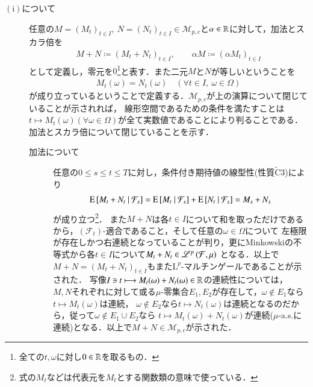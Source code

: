 	\begin{description}
		\item[$\mathrm{(i)}$について] 
			任意の$M=(M_t)_{t \in I},\ N=(N_t)_{t \in I} \in \mathcal{M}_{p,c}$と$\alpha \in \mathbb{R}$に対して，加法とスカラ倍を
			\begin{align}
				M + N \coloneqq (M_t + N_t)_{t \in I}, \qquad \alpha M \coloneqq (\alpha M_t)_{t \in I}
			\end{align}
			として定義し，零元を$0$\footnote{全ての$t,\omega$に対し$0 \in \mathbb{R}$を取るもの．}と表す．また二元$M$と$N$が等しいということを
			\begin{align}
				M_t(\omega) = N_t(\omega) \quad (\forall t \in I,\ \omega \in \Omega)
			\end{align}
			が成り立っているということで定義する．$\mathcal{M}_{p,c}$が上の演算について閉じていることが示されれば，
			線形空間であるための条件を満たすことは$t \longmapsto M_t(\omega) (\forall \omega \in \Omega)$が全て実数値であることにより判ることである．
			加法とスカラ倍について閉じていることを示す．
			\begin{description}
				\item[加法について]
					任意の$0 \leq s \leq t \leq T$に対し，条件付き期待値の線型性(性質$\tilde{\mathrm{C}}3$)により
					\begin{align}
						\operatorname{E} \left[ M_t + N_t \ \middle|\ \mathcal{F}_s \right] = \operatorname{E} \left[ M_t \ \middle|\ \mathcal{F}_s \right] + \operatorname{E} \left[ N_t \ \middle|\ \mathcal{F}_s \right] = M_s + N_s
					\end{align}
					が成り立つ\footnote{式の$M_t$などは代表元を$M_t$とする関数類の意味で使っている．}．
					また$M+N$は各$t \in I$について和を取っただけであるから，$(\mathcal{F}_t)$-適合であること，そして任意の$\omega \in \Omega$について
					左極限が存在しかつ右連続となっていることが判り，更にMinkowskiの不等式から各$t \in I$について$M_t + N_t \in \mathscr{L}^{p} \left(\mathcal{F},\mu\right)$
					となる．以上で$M+N = (M_t + N_t)_{t \in I}$もまた$\mathrm{L}^p$-マルチンゲールであることが示された．
					写像$I \ni t \longmapsto M_t(\omega) + N_t(\omega) \in \mathbb{R}$の連続性については，
					$M,N$それぞれに対して或る$\mu$-零集合$E_1,E_2$が存在して，$\omega \notin E_1$なら$t \longmapsto M_t(\omega)$は連続，
					$\omega \notin E_2$なら$t \longmapsto N_t(\omega)$は連続となるのだから，従って$\omega \notin E_1 \cup E_2$なら
					$t \longmapsto M_t(\omega) + N_t(\omega)$が連続($\mu$-a.s.に連続)となる．以上で$M+N \in \mathcal{M}_{p,c}$が示された．
				

\end{description}
\end{description}
